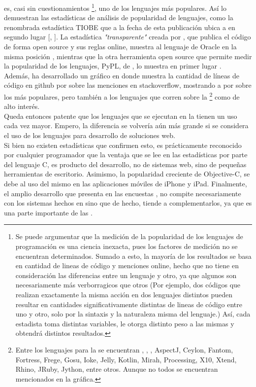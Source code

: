 \java es, casi sin cuestionamientos \footnote{
	Se puede argumentar que la medición de la popularidad de
	los lenguajes de programación es una ciencia inexacta, pues los factores de medición no
	se encuentran determinados. Sumado a esto, la mayoría de los resultados se basa en
	cantidad de lineas de código y menciones online, hecho que no tiene en consideración las
	diferencias entre un lenguaje y otro, ya que algunos son necesariamente más
	verborragicos que otros (Por ejemplo, dos códigos que realizan exactamente la misma
	acción en dos lenguajes distintos pueden resultar en cantidades significativamente
	distintas de lineas de código entre uno y otro, solo por la sintaxis y la naturaleza
	misma del lenguaje.) Así, cada estadista toma distintas variables, le otorga distinto
	peso a las mismas y obtendrá distintos resultados.
}, uno de los lenguajes más populares. Así lo demuestran las estadísticas de análisis de
popularidad de lenguajes, como la renombrada estadística TIOBE que a la fecha de esta
publicación ubica a \java en segundo lugar [,
\citeyear{TIOBE:2014:ONLINE}]. La estadística \emph{"transparente"} creada por
, que publica el código de forma open source y
sus reglas online, muestra al lenguaje de Oracle en la misma posición
, mientras que la otra herramienta open source que
permite medir la popularidad de los lenguajes, PyPL, de
, lo muestra en primer lugar
.\\
Además,  ha desarrollado un gráfico en donde muestra la
cantidad de líneas de código en \gls{github} por sobre las menciones en
\gls{stackoverflow}, mostrando a \java por sobre los más populares, pero también a los
lenguajes que corren sobre la \jvm\footnote{
	Entre los lenguajes para la \jvm se encuentran \scala, \clojure, \groovy, AspectJ,
	Ceylon, Fantom, Fortress, Frege, Gosu, Ioke, Jelly, Kotlin, Mirah, Processing, X10,
	Xtend, Rhino, JRuby, Jython, entre otros. Aunque no todos se encuentran mencionados
	en la gráfica.
} como de alto interés.\\
Queda entonces patente que los lenguajes que se ejecutan en la \jvm tienen un uso cada vez
mayor. Empero, la diferencia se volvería aún más grande si se considera el uso de los
lenguajes para desarrollo de soluciones web.\\
Si bien no existen estadísticas que confirmen esto, es prácticamente reconocido por
cualquier programador que la ventaja que se lee en las estadísticas por parte del lenguaje
C, es producto del desarrollo, no de sistemas web, sino de pequeñas herramientas de
escritorio. Asimismo, la popularidad creciente de Objective-C, se debe al uso del mismo en
las aplicaciones móviles de iPhone y iPad. Finalmente, el amplio desarrollo que presenta
en las encuestas \js, no compite necesariamente con los sistemas hechos en \jvm sino que
de hecho, tiende a complementarlos, ya que es una parte importante de las
\rias{}.\\



